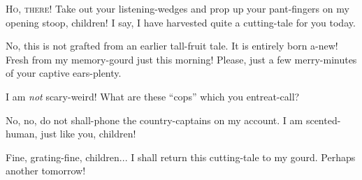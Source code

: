 
\lettrine{H}{o, there!}
Take out your listening-wedges and prop up your pant-fingers
on my opening stoop, children! I say, I have harvested quite a
cutting-tale for you today.

No, this is not grafted from an earlier tall-fruit tale. It is entirely
born a-new! Fresh from my memory-gourd just this morning! Please, just a
few merry-minutes of your captive ears-plenty.

I am \emph{not} scary-weird! What are these ``cops'' which you
entreat-call?

No, no, do not shall-phone the country-captains on my account. I am
scented-human, just like you, children!

Fine, grating-fine, children... I shall return this cutting-tale to my
gourd. Perhaps another tomorrow!
